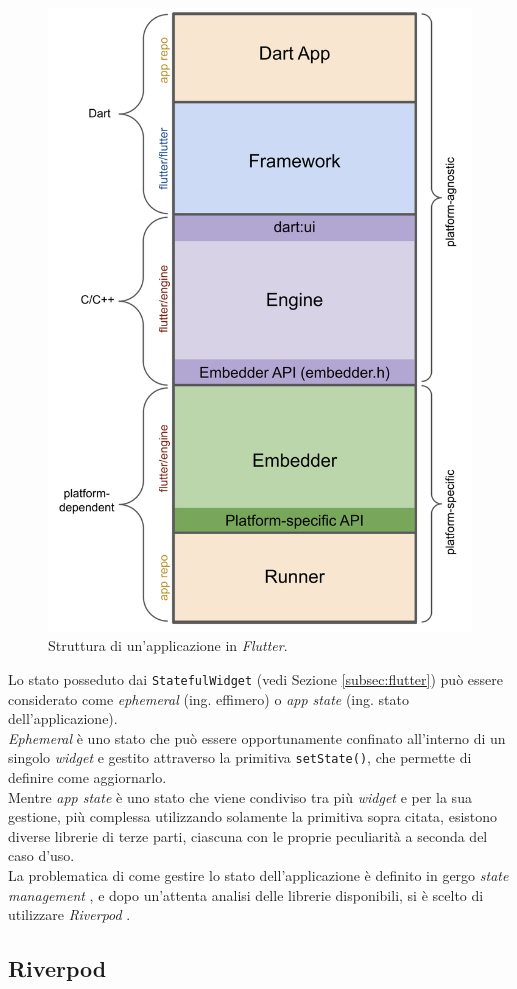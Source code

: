 \begin{figure}[!h] 
    \centering 
    \includegraphics[width=0.4\columnwidth]{images/flutter-app-anatomy.png} 
    \caption{Struttura di un'applicazione \cite{site:flutter-architecture} in \emph{Flutter}.}
    \label{fig:architettura-flutter}
\end{figure}

Lo stato posseduto dai \lstinline{StatefulWidget} (vedi Sezione \ref{subsec:flutter}) può essere considerato come \emph{ephemeral} (ing. effimero) o \emph{app state} (ing. stato dell'applicazione). \\
\emph{Ephemeral} è uno stato che può essere opportunamente confinato all'interno di un singolo \emph{widget} e gestito attraverso la primitiva \lstinline{setState()}, che permette di definire come aggiornarlo.\\
Mentre \emph{app state} è uno stato che viene condiviso tra più \emph{widget} e per la sua gestione, più complessa utilizzando solamente la primitiva sopra citata, esistono diverse librerie di terze parti, ciascuna con le proprie peculiarità a seconda del caso d'uso.\\
La problematica di come gestire lo stato dell'applicazione è definito in gergo \emph{state management} \cite{site:flutter-state-mgmt}, e dopo un'attenta analisi delle librerie disponibili, si è scelto di utilizzare \emph{Riverpod} \cite{site:riverpod}.
\subsection{Riverpod}
\label{subsec:riverpod}

